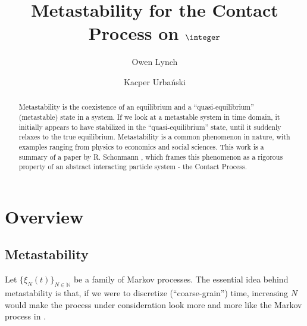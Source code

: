 \documentclass{scrartcl}
\title{Metastability for the Contact Process on $\integer$}
\author{Owen Lynch \and Kacper Urbański}
\begin{document}
\maketitle
\begin{abstract}
    Metastability is the coexistence of an equilibrium and a ``quasi-equilibrium'' (metastable) state in a system. If we look at a metastable system in time domain, it 
    initially appears to have stabilized in the ``quasi-equilibrium'' state,
    until it suddenly relaxes to the true equilibrium. Metastability is a common phenomenon in nature, with examples ranging from physics to economics and social sciences. 
    This work is a summary of a paper by R. Schonmann \cite{schonmann}, which
    frames this phenomenon as a rigorous property of an abstract interacting particle system - the Contact Process.
\end{abstract}

\section{Overview} \label{overview}

\subsection{Metastability}

Let $\{ \xi_N(t) \}_{N\in\mathbb{N}}$ be a family of Markov processes. The essential idea behind metastability is that, if we were to discretize (``coarse-grain'') time, increasing $N$ would make the process under consideration look more and more like the Markov process in .
\end{document}
